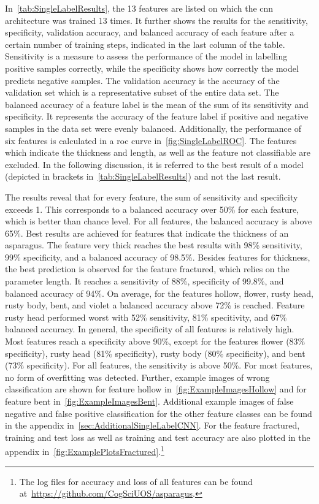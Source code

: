 \bigskip
In~\autoref{tab:SingleLabelResults}, the 13 features are listed on which the \acrshort{cnn} architecture was trained 13 times. It further shows the results for the sensitivity, specificity, validation accuracy, and balanced accuracy of each feature after a certain number of training steps, indicated in the last column of the table.
Sensitivity is a measure to assess the performance of the model in labelling positive samples correctly, while the specificity shows how correctly the model predicts negative samples. The validation accuracy is the accuracy of the validation set which is a representative subset of the entire data set. The balanced accuracy of a feature label is the mean of the sum of its sensitivity and specificity. It represents the accuracy of the feature label if positive and negative samples in the data set were evenly balanced.
Additionally, the performance of six features is calculated in a \acrshort{roc} curve in~\ref{fig:SingleLabelROC}. The features which indicate the thickness and length, as well as the feature not classifiable are excluded.
In the following discussion, it is referred to the best result of a model (depicted in brackets in~\autoref{tab:SingleLabelResults}) and not the last result.

The results reveal that for every feature, the sum of sensitivity and specificity exceeds 1.  This corresponds to a balanced accuracy over 50\% for each feature, which is better than chance level. For all features, the balanced accuracy is above 65\%. Best results are achieved for features that indicate the thickness of an asparagus. The feature very thick reaches the best results with 98\% sensitivity, 99\% specificity, and a balanced accuracy of 98.5\%. Besides features for thickness, the best prediction is observed for the feature fractured, which relies on the parameter length. It reaches a sensitivity of 88\%, specificity of 99.8\%, and balanced accuracy of 94\%.
On average, for the features hollow, flower, rusty head, rusty body, bent, and violet a balanced accuracy above 72\% is reached. Feature rusty head performed worst with 52\% sensitivity, 81\% specitivity, and 67\% balanced accuracy. In general, the specificity of all features is relatively high. Most features reach a specificity above 90\%, except for the features flower (83\% specificity), rusty head (81\% specificity), rusty body (80\% specificity), and bent (73\% specificity). For all features, the sensitivity is above 50\%. For most features, no form of overfitting was detected.
Further, example images of wrong classification are shown for feature hollow in~\autoref{fig:ExampleImagesHollow} and for feature bent in~\autoref{fig:ExampleImagesBent}. Additional example images of false negative and false positive classification for the other feature classes can be found in the appendix in~\autoref{sec:AdditionalSingleLabelCNN}. For the feature fractured, training and test loss as well as training and test accuracy are also plotted in the appendix in~\autoref{fig:ExamplePlotsFractured}.\footnote{The log files for accuracy and loss of all features can be found at~\url{https://github.com/CogSciUOS/asparagus}.}
 
